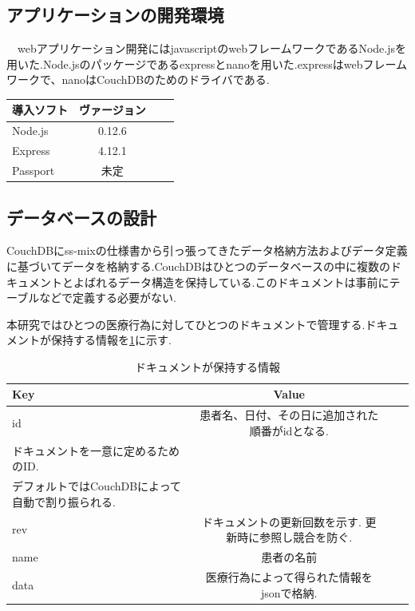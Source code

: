 \subsection{アプリケーションの開発環境}
　webアプリケーション開発にはjavascriptのwebフレームワークであるNode.jsを用いた.Node.jsのパッケージであるexpressとnanoを用いた.expressはwebフレームワークで、nanoはCouchDBのためのドライバである.

\begin{table}[htb]
	\begin{tabular}{|l|c|r|r|}\hline
	導入ソフト & ヴァージョン \\ \hline \hline
	Node.js & 0.12.6 \\ \hline
	Express & 4.12.1 \\ \hline
	Passport & 未定 \\ \hline
	\end{tabular}
\end{table}


\subsection{データベースの設計}
	CouchDBにss-mixの仕様書から引っ張ってきたデータ格納方法およびデータ定義\cite{bibi1}に基づいてデータを格納する.CouchDBはひとつのデータベースの中に複数のドキュメントとよばれるデータ構造を保持している.このドキュメントは事前にテーブルなどで定義する必要がない.

	本研究ではひとつの医療行為に対してひとつのドキュメントで管理する.ドキュメントが保持する情報を\ref{tab:doc}に示す.


\begin{table}[htb]
	\caption{ドキュメントが保持する情報}
	\begin{tabular}{|l|c|r|r|}\hline
	Key & Value \\ \hline \hline
	id &  患者名、日付、その日に追加された順番がidとなる.\\
				ドキュメントを一意に定めるためのID.\\
				デフォルトではCouchDBによって自動で割り振られる.\\ \hline
	rev & ドキュメントの更新回数を示す. 更新時に参照し競合を防ぐ. \\ \hline
	name & 患者の名前 \\ \hline
	data & 医療行為によって得られた情報をjsonで格納. \\ \hline
	\end{tabular}
	\label{tab:doc}
\end{table}



